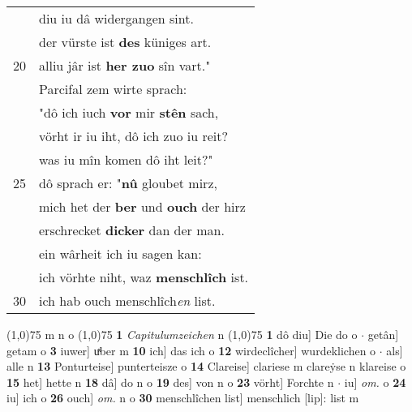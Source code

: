 \documentclass[8pt,a4paper,notitlepage]{article}
\begin{document}
\begin{table}[ht]
\begin{minipage}[t]{0.5\linewidth}
\begin{tabular}{rl}
 & diu iu dâ widergangen sint.\\ 
 & der vürste ist \textbf{des} küniges art.\\ 
20 & alliu jâr ist \textbf{her zuo} sîn vart."\\ 
 & Parcifal zem wirte sprach:\\ 
 & "dô ich iuch \textbf{vor} mir \textbf{stên} sach,\\ 
 & vörht ir iu iht, dô ich zuo iu reit?\\ 
 & was iu mîn komen dô iht leit?"\\ 
25 & dô sprach er: "\textbf{nû} gloubet mirz,\\ 
 & mich het der \textbf{ber} und \textbf{ouch} der hirz\\ 
 & erschrecket \textbf{dicker} dan der man.\\ 
 & ein wârheit ich iu sagen kan:\\ 
 & ich vörhte niht, waz \textbf{menschlîch} ist.\\ 
30 & ich hab ouch menschlîch\textit{en} list.\\ 
\end{tabular}
\scriptsize
\line(1,0){75} \newline
m n o \newline
\line(1,0){75} \newline
\textbf{1} \textit{Capitulumzeichen} n  \newline
\line(1,0){75} \newline
\textbf{1} dô diu] Die do o  $\cdot$ getân] getam o \textbf{3} iuwer] uͯber m \textbf{10} ich] das ich o \textbf{12} wirdeclîcher] wurdeklichen o  $\cdot$ als] alle n \textbf{13} Ponturteise] punterteisze o \textbf{14} Clareise] clariese m clareẏse n klareise o \textbf{15} het] hette n \textbf{18} dâ] do n o \textbf{19} des] von n o \textbf{23} vörht] Forchte n  $\cdot$ iu] \textit{om.} o \textbf{24} iu] ich o \textbf{26} ouch] \textit{om.} n o \textbf{30} menschlîchen list] menschlich [lip]: list m \newline
\end{minipage}
\end{table}
\newpage
\end{document}
